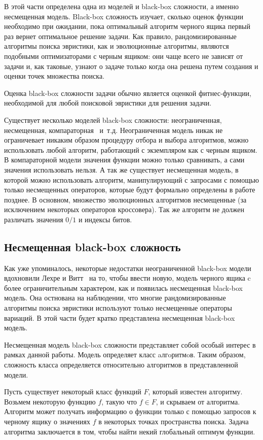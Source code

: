 В этой части определена одна из моделей и black-box сложности, а именно несмещенная модель.
Black-box сложность изучает, сколько оценок функции необходимо при ожидании, пока оптимальный алгоритм черного ящика первый раз вернет оптимальное решение задачи.
Как правило, рандомизированные алгоритмы поиска эвристики, как и эволюционные алгоритмы, являются подобными оптимизаторами с черным ящиком: они чаще всего не зависят
от задачи и, как таковые, узнают о задаче только когда она решена путем создания и оценки точек множества поиска.

Оценка black-box сложности задачи обычно является оценкой фитнес-функции, необходимой для любой поисковой эвристики для решения задачи.

Существует несколько моделей black-box сложности: неограниченная, несмещенная, компараторная~\cite{3} и~т.д. Неограниченная модель никак не ограничевает никаким образом процедуру отбора и выбора 
алгоритмов, можно 
использовать любой алгоритм, работающий с экземпляром как с черным ящиком. В компараторной модели значения функции можно только сравнивать, а сами значения использовать нельзя. А так же существует несмещенная модель, в которой можно использовать алгоритм, манипулирующий с запросами с помощью только несмещенных операторов, которые будут формально определены в работе позднее. В основном, множество эволюционных алгоритмов несмещенные (за исключением некоторых операторов кроссовера). Так же алгоритм не должен различать значения $0/1$ и индексы битов.

\subsection{Несмещенная black-box сложность}
Как уже упоминалось, некоторые недостатки неограниченной black-box модели вдохновили Лехре и Витт~\cite{1} на то, чтобы ввести новую, модель черного ящика c более ограничительным характером, как и 
появилась несмещенная black-box модель. Она остнована на наблюдении, что многие рандомизированные алгоритмы поиска эвристики используют только несмещенные операторы вариаций. 
В этой части будет кратко представлена несмещенная black-box модель. 

Несмещенная модель black-box сложности  представляет собой особый интерес в рамках данной работы. Модель определяет класс aлгoритмoв. Таким образом, сложность класса определяется относительно алгоритмов
в представленной модели.

Пусть существует некоторый класс функций $F$, который известен алгоритму. Возьмем некоторую функцию $f$, такую что $f \in F$, и скрываем от алгоритма. Алгоритм может получать информацию о функции 
только с помощью запросов к черному ящику о значениях $f$ в некоторых точках пространства поиска. Задача алгоритма заключается в том, чтобы найти некий глобальный оптимум функции.

